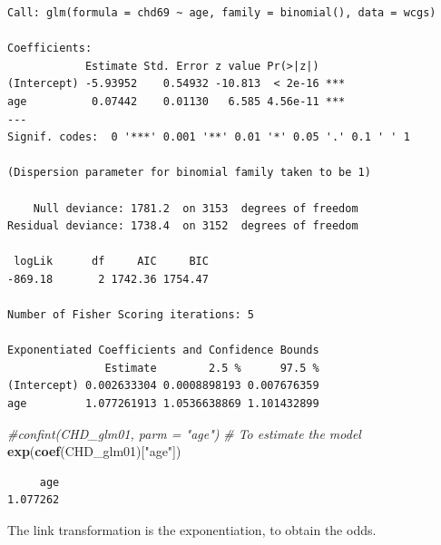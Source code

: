 \documentclass[
]{article}
\newenvironment{Shaded}{\begin{snugshade}}{\end{snugshade}}
\newcommand{\CommentTok}[1]{\textcolor[rgb]{0.56,0.35,0.01}{\textit{#1}}}
\newcommand{\KeywordTok}[1]{\textcolor[rgb]{0.13,0.29,0.53}{\textbf{#1}}}
\newcommand{\NormalTok}[1]{#1}
\newcommand{\StringTok}[1]{\textcolor[rgb]{0.31,0.60,0.02}{#1}}
\begin{document}
\begin{verbatim}
Call: glm(formula = chd69 ~ age, family = binomial(), data = wcgs)

Coefficients:
            Estimate Std. Error z value Pr(>|z|)    
(Intercept) -5.93952    0.54932 -10.813  < 2e-16 ***
age          0.07442    0.01130   6.585 4.56e-11 ***
---
Signif. codes:  0 '***' 0.001 '**' 0.01 '*' 0.05 '.' 0.1 ' ' 1

(Dispersion parameter for binomial family taken to be 1)

    Null deviance: 1781.2  on 3153  degrees of freedom
Residual deviance: 1738.4  on 3152  degrees of freedom

 logLik      df     AIC     BIC 
-869.18       2 1742.36 1754.47 

Number of Fisher Scoring iterations: 5

Exponentiated Coefficients and Confidence Bounds
               Estimate        2.5 %      97.5 %
(Intercept) 0.002633304 0.0008898193 0.007676359
age         1.077261913 1.0536638869 1.101432899
\end{verbatim}

\begin{Shaded}
\begin{Highlighting}[]
\CommentTok{#confint(CHD_glm01, parm = "age")}
\CommentTok{# To estimate the model}
\KeywordTok{exp}\NormalTok{(}\KeywordTok{coef}\NormalTok{(CHD_glm01)[}\StringTok{"age"}\NormalTok{])}
\end{Highlighting}
\end{Shaded}

\begin{verbatim}
     age 
1.077262 
\end{verbatim}

The link transformation is the exponentiation, to obtain the odds.
\end{document}
